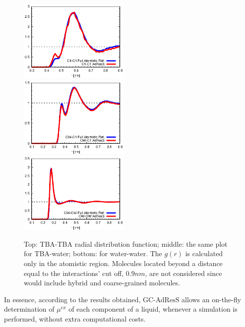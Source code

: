 \documentclass[a4paper,preprint,unsortedaddress]{revtex4-1}
\begin{document}
\begin{figure}
\center
\includegraphics[width=0.475\textwidth]{alcohol-alcohol.eps}\\
\includegraphics[width=0.475\textwidth]{alcohol-water.eps}\\
\includegraphics[width=0.475\textwidth]{water-water.eps}
\caption{Top: TBA-TBA radial distribution function; middle: the same plot for TBA-water; bottom: for water-water. The $g(r)$ is calculated only in the atomistic region.  Molecules located beyond a distance equal to the interactions' cut off, $0.9 nm$, are not considered since would include hybrid and coarse-grained molecules. \label{gr}}
\end{figure} 
In essence, according to the results obtained, GC-AdResS allows an on-the-fly determination of $\mu^{ex}$ of each component of a liquid, whenever a simulation is performed, without extra computational costs.
\end{document}
